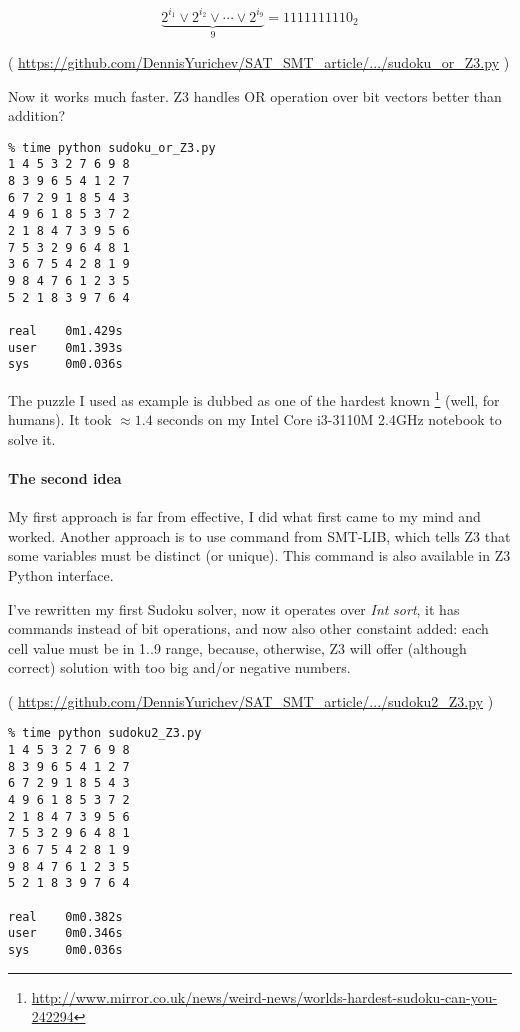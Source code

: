 \begin{equation}
\underbrace{2^{i_1} \vee 2^{i_2} \vee \cdots \vee 2^{i_9}}_9 = 1111111110_2
\end{equation}


( \url{https://github.com/DennisYurichev/SAT_SMT_article/.../sudoku_or_Z3.py} )

Now it works much faster. Z3 handles OR operation over bit vectors better than addition?

\begin{lstlisting}
% time python sudoku_or_Z3.py
1 4 5 3 2 7 6 9 8
8 3 9 6 5 4 1 2 7
6 7 2 9 1 8 5 4 3
4 9 6 1 8 5 3 7 2
2 1 8 4 7 3 9 5 6
7 5 3 2 9 6 4 8 1
3 6 7 5 4 2 8 1 9
9 8 4 7 6 1 2 3 5
5 2 1 8 3 9 7 6 4

real    0m1.429s
user    0m1.393s
sys     0m0.036s
\end{lstlisting}

The puzzle I used as example is dubbed as one of the hardest known
\footnote{\url{http://www.mirror.co.uk/news/weird-news/worlds-hardest-sudoku-can-you-242294}} (well, for humans).
It took $\approx 1.4$ seconds on my Intel Core i3-3110M 2.4GHz notebook to solve it.

\paragraph{The second idea}

My first approach is far from effective, I did what first came to my mind and worked.
Another approach is to use  command from SMT-LIB, which tells Z3 that some variables must be distinct (or unique).
This command is also available in Z3 Python interface.

I've rewritten my first Sudoku solver, now it operates over \textit{Int} \textit{sort}, it has  commands instead of bit operations,
and now also other constaint added: each cell value must be in 1..9 range, because, otherwise, Z3 will offer (although correct) solution with too big
and/or negative numbers.


( \url{https://github.com/DennisYurichev/SAT_SMT_article/.../sudoku2_Z3.py} )

\begin{lstlisting}
% time python sudoku2_Z3.py
1 4 5 3 2 7 6 9 8
8 3 9 6 5 4 1 2 7
6 7 2 9 1 8 5 4 3
4 9 6 1 8 5 3 7 2
2 1 8 4 7 3 9 5 6
7 5 3 2 9 6 4 8 1
3 6 7 5 4 2 8 1 9
9 8 4 7 6 1 2 3 5
5 2 1 8 3 9 7 6 4

real    0m0.382s
user    0m0.346s
sys     0m0.036s
\end{lstlisting}

